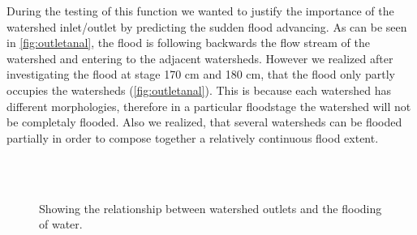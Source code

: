 During the testing of this function we wanted to justify the importance of the watershed inlet/outlet by predicting the sudden flood advancing. As can be seen in \autoref{fig:outletanal}, the flood is following backwards the flow stream of the watershed and entering to the adjacent watersheds. However we realized after investigating the flood at stage 170 cm and 180 cm, that the flood only partly occupies the watersheds (\autoref{fig:outletanal}). This is because each watershed has different morphologies, therefore in a particular floodstage the watershed will not be completaly flooded. Also we realized, that several watersheds can be flooded partially in order to compose together a relatively continuous flood extent.

\begin{figure}[h!]
  \myfloatalign
   \\ \quad
   \\
  \caption{Showing the relationship between watershed outlets and the flooding of water.}
  \label{fig:outletanal}
\end{figure}

